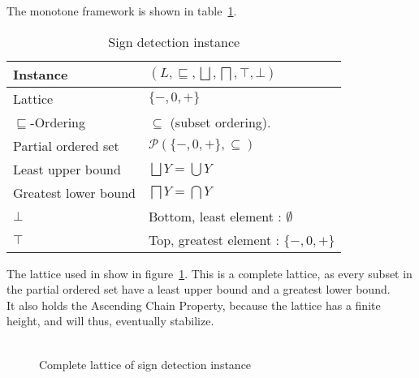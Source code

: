 The monotone framework is shown in table~\ref{table:sign_detection_instance}.
\begin{table}
\begin{tabular}{| l | l |}
  \hline
  Instance & $(L,\sqsubseteq,\bigsqcup, \bigsqcap, \top, \bot )$ \\
  \hline
  \hline
  Lattice  & $\{-,0,+\}$ \\
  \hline
  $\sqsubseteq$-Ordering  &  $\subseteq$ (subset ordering).\\
  \hline
  Partial ordered set    & $\mathcal{P}(\{-,0,+\}, \subseteq)$ \\
  \hline
  Least upper bound      & $\bigsqcup Y = \bigcup Y$\\
  \hline
  Greatest lower bound   & $\bigsqcap Y = \bigcap Y$\\
  \hline
  $\bot$                 & Bottom, least element : $\emptyset$\\
  \hline
  $\top$                 & Top, greatest element : $\{-,0,+\}$\\
\hline   
\end{tabular}
  \centering
  \caption{Sign detection instance}
  \label{table:sign_detection_instance}
\end{table}
\noindent The lattice used in show in figure~\ref{fig:sign_detection_complete_lattice}. This is a complete lattice, as every subset in the partial ordered set have a least upper bound and a greatest lower bound.\\
It also holds the Ascending Chain Property, because the lattice has a finite height, and will thus, eventually stabilize.\\\\
 \begin{figure}
 \centering
  \caption{Complete lattice of sign detection instance}
 
  \label{fig:sign_detection_complete_lattice}
 \end{figure}
